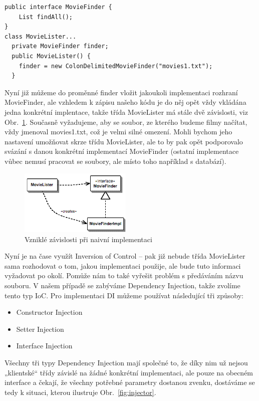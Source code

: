 \documentclass[a4paper,conference]{IEEEtran}
\newcommand{\fig}[1]{Obr.~\ref{fig:#1}}      %
\begin{document}
\lstset{language=Java, caption=Naplnění proměnné finder s využitím interface, label=listing:Java}
\begin{lstlisting}
public interface MovieFinder {
    List findAll();
}
class MovieLister...
  private MovieFinder finder;
  public MovieLister() {
    finder = new ColonDelimitedMovieFinder("movies1.txt");
  }
\end{lstlisting}

Nyní již můžeme do proměnné finder vložit jakoukoli implementaci rozhraní MovieFinder, ale vzhledem k zápisu našeho kódu je do něj opět vždy vkládána jedna konkrétní implentace, takže třída MovieLister má stále dvě závislosti, viz \fig{naive}. Současně vyžadujeme, aby se soubor, ze kterého budeme filmy načítat, vždy jmenoval movies1.txt, což je velmi silné omezení. Mohli bychom jeho nastavení umožňovat skrze třídu MovieLister, ale to by pak opět podporovalo svázání s danou konkrétní implementací MovieFinder (ostatní implementace vůbec nemusí pracovat se soubory, ale místo toho například s databází).

\begin{figure}[!ht]
\centering
\includegraphics[width=2.1in]{1-Naive}
\caption{Vzniklé závislosti při naivní implementaci}
\label{fig:naive}
\end{figure}

Nyní je na čase využít Inversion of Control – pak již nebude třída MovieLister sama rozhodovat o tom, jakou implementaci použije, ale bude tuto informaci vyžadovat po okolí. Pomůže nám to také vyřešit problém s předáváním názvu souboru. V našem případě se zabýváme Dependency Injection, takže zvolíme tento typ IoC. Pro implementaci DI můžeme používat následující tři způsoby:

\begin{itemize}
\item{Constructor Injection} 
\item{Setter Injection} 
\item{Interface Injection} 
\end{itemize}

Všechny tři typy Dependency Injection mají společné to, že díky nim už nejsou „klientské“ třídy závislé na žádné konkrétní implementaci, ale pouze na obecném interface a čekají, že všechny potřebné parametry dostanou zvenku, dostáváme se tedy k situaci, kterou ilustruje \fig{injector}.
\end{document}

